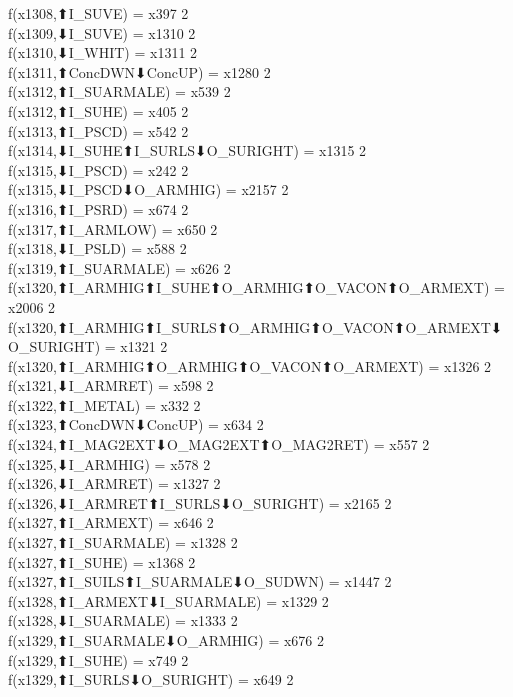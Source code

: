 f(x1308,⬆I_SUVE) = x397 {2} \\
f(x1309,⬇I_SUVE) = x1310 {2} \\
f(x1310,⬇I_WHIT) = x1311 {2} \\
f(x1311,⬆ConcDWN⬇ConcUP) = x1280 {2} \\
f(x1312,⬆I_SUARMALE) = x539 {2} \\
f(x1312,⬆I_SUHE) = x405 {2} \\
f(x1313,⬆I_PSCD) = x542 {2} \\
f(x1314,⬇I_SUHE⬆I_SURLS⬇O_SURIGHT) = x1315 {2} \\
f(x1315,⬇I_PSCD) = x242 {2} \\
f(x1315,⬇I_PSCD⬇O_ARMHIG) = x2157 {2} \\
f(x1316,⬆I_PSRD) = x674 {2} \\
f(x1317,⬆I_ARMLOW) = x650 {2} \\
f(x1318,⬇I_PSLD) = x588 {2} \\
f(x1319,⬆I_SUARMALE) = x626 {2} \\
f(x1320,⬆I_ARMHIG⬆I_SUHE⬆O_ARMHIG⬆O_VACON⬆O_ARMEXT) = x2006 {2} \\
f(x1320,⬆I_ARMHIG⬆I_SURLS⬆O_ARMHIG⬆O_VACON⬆O_ARMEXT⬇O_SURIGHT) = x1321 {2} \\
f(x1320,⬆I_ARMHIG⬆O_ARMHIG⬆O_VACON⬆O_ARMEXT) = x1326 {2} \\
f(x1321,⬇I_ARMRET) = x598 {2} \\
f(x1322,⬆I_METAL) = x332 {2} \\
f(x1323,⬆ConcDWN⬇ConcUP) = x634 {2} \\
f(x1324,⬆I_MAG2EXT⬇O_MAG2EXT⬆O_MAG2RET) = x557 {2} \\
f(x1325,⬇I_ARMHIG) = x578 {2} \\
f(x1326,⬇I_ARMRET) = x1327 {2} \\
f(x1326,⬇I_ARMRET⬆I_SURLS⬇O_SURIGHT) = x2165 {2} \\
f(x1327,⬆I_ARMEXT) = x646 {2} \\
f(x1327,⬆I_SUARMALE) = x1328 {2} \\
f(x1327,⬆I_SUHE) = x1368 {2} \\
f(x1327,⬆I_SUILS⬆I_SUARMALE⬇O_SUDWN) = x1447 {2} \\
f(x1328,⬆I_ARMEXT⬇I_SUARMALE) = x1329 {2} \\
f(x1328,⬇I_SUARMALE) = x1333 {2} \\
f(x1329,⬆I_SUARMALE⬇O_ARMHIG) = x676 {2} \\
f(x1329,⬆I_SUHE) = x749 {2} \\
f(x1329,⬆I_SURLS⬇O_SURIGHT) = x649 {2} \\
